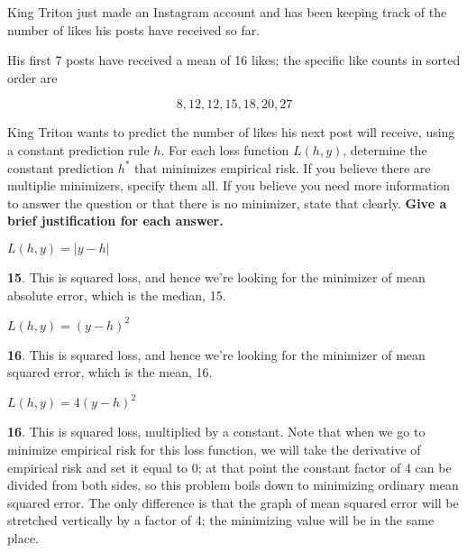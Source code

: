 \documentclass{article}
\begin{document}
\newpage
\begin{probset}

\vspace{.25in}

\begin{prob}

King Triton just made an Instagram account and has been keeping track of the number of likes his posts have received so far.

His first 7 posts have received a mean of 16 likes; the specific like counts in sorted order are

$$8, 12, 12, 15, 18, 20, 27$$

King Triton wants to predict the number of likes his next post will receive, using a constant prediction rule $h$. For each loss function $L(h, y)$, determine the constant prediction $h^*$ that minimizes empirical risk. If you believe there are multiplie minimizers, specify them all. If you believe you need more information to answer the question or that there is no minimizer, state that clearly. \textbf{Give a brief justification for each answer.}

\begin{subprobset}

\begin{subprob}[1 Point]
$L(h, y) = |y - h|$

\begin{soln}
\textbf{15}. This is squared loss, and hence we're looking for the minimizer of mean absolute error, which is the median, 15.
\end{soln}
\end{subprob}

\vspace{.75in}

\begin{subprob}[1 Point]
$L(h, y) = (y - h)^2$

\begin{soln}
\textbf{16}. This is squared loss, and hence we're looking for the minimizer of mean squared error, which is the mean, 16.
\end{soln}
\end{subprob}

\vspace{.75in}

\begin{subprob}[1.5 Points]
$L(h, y) = 4(y - h)^2$

\begin{soln}
\textbf{16}. This is squared loss, multiplied by a constant. Note that when we go to minimize empirical risk for this loss function, we will take the derivative of empirical risk and set it equal to 0; at that point the constant factor of 4 can be divided from both sides, so this problem boils down to minimizing ordinary mean squared error. The only difference is that the graph of mean squared error will be stretched vertically by a factor of 4; the minimizing value will be in the same place.


\end{soln}
\end{subprob}
\end{subprobset}
\end{prob}
\end{probset}
\end{document}
